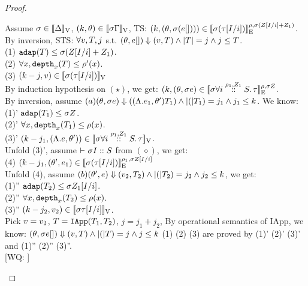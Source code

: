 \documentclass[a4paper,11pt]{article}
\newcommand{\wq}[1]{\textcolor[rgb]{.50,0.0,0.7}{[WQ: #1]}}
\theoremstyle{definition}
\begin{document}
\begin{proof}
\begin{mainitem}
Assume $\ienv \in \lrv{\Delta}$, $(\stepiA, \env) \in \lrv{\ienv \Gamma}$, TS: $(\stepiA, (\env, \ienv (\expr []))) \in \lre{\dmap}{\ienv(\nnatA[I/i] + \nnatA_1)}{\ienv(\type[I/i])}$.\\
%
By inversion, STS: $\forall \valr, \tr, j$ s.t. $(\env, \expr []) \bigstep (\valr, \tr) \land \size{\tr} = j \land j \leq \tr $.\\
(1) $ \adap(\tr) \leq \ienv (\nnatA[I/i] + \nnatA_1)$.\\
(2) $ \forall x, \ddep{x}(\tr) \leq \dmap'(x) $.\\
(3) $ (\stepiA - j, \valr) \in \lrv{\ienv(\type[I/i])}$\\
By induction hypothesis on $(\star)$, we get: $(k, (\env, \ienv \expr) \in \lre{\dmap}{\ienv \nnatA}{\ienv \tforall{\dmap_1}{\nnatA_1}{i} \type}$.\\
%
By inversion, assume $(a) (\env, \ienv \expr) \bigstep ((\eilam \expr_1, \env') \tr_1) \land \size(\tr_1) = j_1 \land j_1 \leq \stepiA$. We know:\\
(1)' $\adap(\tr_1) \leq \ienv \nnatA$.\\
(2)' $\forall x, \ddep{x}(\tr_1) \leq \dmap(x)$.\\
(3)' $(\stepiA - j_1, (\eilam \expr, \env')) \in \lrv{\ienv \tforall{\dmap_1}{\nnatA_1}{i} \type} $.\\
Unfold (3)', assume $\tvdash{} \ienv I ::S$ from $(\diamond)$, we get:\\
(4) $(k - j_1, (\env', \expr_1) \in \lre{\dmap_1}{\ienv \nnatA[I/i]}{\ienv (\type[I/i])}$\\
%
Unfold (4), assume $(b) (\env', \expr ) \bigstep (\valr_2, \tr_2) \land \size(\tr_2) = j_2 \land j_2 \leq \stepiA$,  we get:\\
(1)'' $\adap(\tr_2) \leq \ienv \nnatA_1[I/i]$.\\
(2)'' $\forall x, \ddep{x}(\tr_2) \leq \dmap(x)$.\\
(3)'' $(\stepiA - j_2, \valr_2) \in \lrv{\ienv \type[I/i]}$.\\
Pick $\valr = \valr_2$, $\tr = \triapp{\tr_1}{\tr_2}$, $j = j_1 + j_2$,
By operational semantics of IApp, we know:
$(\env, \ienv \expr []) \bigstep (\valr, \tr) \land \size(\tr) = j \land j \leq \stepiA$
(1) (2) (3) are proved by (1)' (2)' (3)' and (1)'' (2)'' (3)''.\\


\wq{ \caseL{
$
  \boxed{
    \inferrule*[right = PRIMITIVE]{
      \Delta; \Gamma; \dmap \tvdash{\nnatA} \expr:  \tbox{  (\tarr{ \type_1
        }{ \type_2 }{0}{\dmap''}{0})     } ~(\star)   \\
      \nnatA' = 1 + \nnatA \\
      \dmap' = 1 + \max( \dmap, \dmap''+ \nnatA)
    }{
      \Delta; \Gamma; \dmap' \tvdash{\nnatA'} \eop(\expr): \treal
    }
    }
$
} }


\end{mainitem}
\end{proof}
\end{document}
